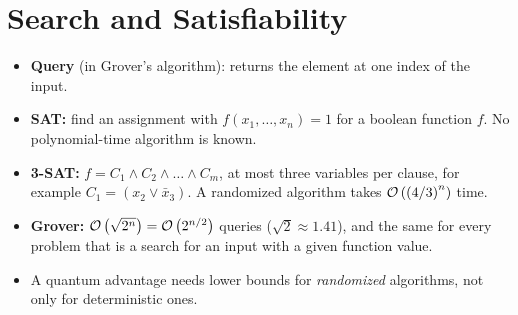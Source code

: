 
\section{Search and Satisfiability}

%
%
%
\begin{itemize}
    \item \textbf{Query} (in Grover's algorithm): returns the element at one index of the input.
    \item \textbf{SAT:} find an assignment with $f(x_1, \dots, x_n) = 1$ for a boolean function
          $f$. No polynomial-time algorithm is known.
    \item \textbf{3-SAT:} $f = C_1 \wedge C_2 \wedge \dots \wedge C_m$, at most three variables per
          clause, for example $C_1 = (x_2 \vee \bar{x}_3)$. A randomized algorithm takes
          $\mathcal{O}\left(\left(4/3\right)^n\right)$ time.
    \item \textbf{Grover:} $\mathcal{O}\left(\sqrt{2^n}\right) = \mathcal{O}\left(2^{n/2}\right)$ queries ($\sqrt{2} \approx 1.41$),
          and the same for every problem that is a search for an input with a given function value.
    \item A quantum advantage needs lower bounds for \emph{randomized} algorithms, not only for
          deterministic ones.
\end{itemize}

